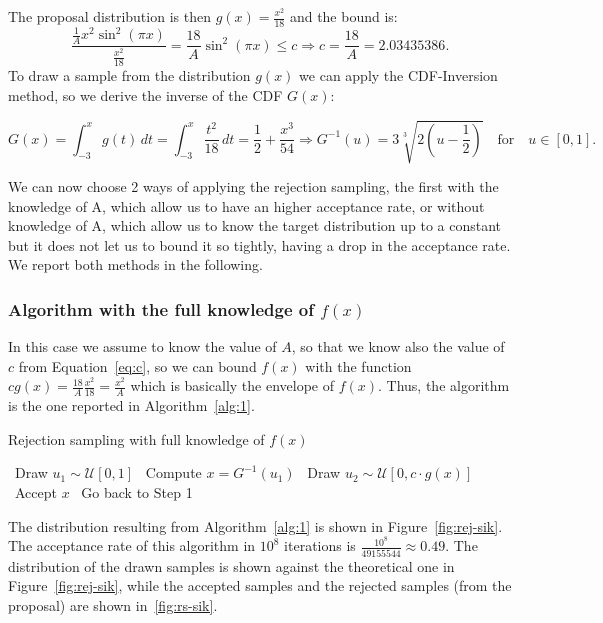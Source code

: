 \documentclass[a4paper]{article}
\begin{document}
\noindent
The proposal distribution is then $g(x) = \frac{x^2}{18}$ and the bound is:
\begin{equation}
  \label{eq:c}
  \frac{\frac{1}{A}x^2\sin^2(\pi x)}{\frac{x^2}{18}} =
  \frac{18}{A}\sin^2(\pi x) \leq c \Rightarrow c = \frac{18}{A} = 2.03435386.
\end{equation}
To draw a sample from the distribution $g(x)$ we can apply the
CDF-Inversion method, so we derive the inverse of the CDF $G(x)$:

\begin{equation*}
  G(x) = \int_{-3}^{x}g(t)\,dt = \int_{-3}^{x} \frac{t^2}{18}\,dt =
  \frac{1}{2}+\frac{x^3}{54}
  \Rightarrow G^{-1}(u) = 3\sqrt[3]{2(u-\frac{1}{2})} \quad
  \text{for}\quad u \in [0,1].
\end{equation*}

We can now choose 2 ways of applying the rejection sampling, the
first with the knowledge of A, which allow us to have an higher
acceptance rate, or without knowledge of A, which allow us to know
the target distribution up to a constant but it does not let us to
bound it so tightly, having a drop in the acceptance rate. We report
both methods in the following.

\subsubsection*{Algorithm with the full knowledge of $f(x)$}
In this case we assume to know the value of $A$, so that we know also
the value of $c$ from Equation~\ref{eq:c}, so we can bound $f(x)$ with the
function $cg(x) = \frac{18}{A}\frac{x^2}{18} =\frac{x^2}{A}$ which is
basically the envelope of $f(x)$.
Thus, the algorithm is the one reported in Algorithm~\ref{alg:1}.

\begin{algorithm}
  \caption{Rejection sampling with full knowledge of $f(x)$}\label{alg:1}
  \begin{algorithmic}[1]
    \STATE~Draw $u_1 \sim \mathcal{U}[0,1]$
    \STATE~Compute $x = G^{-1}(u_1)$
    \STATE~Draw $u_2 \sim \mathcal{U}[0, c \cdot g(x)]$
    \STATE~Accept $x$
    \ELSE%
    \STATE~Go back to Step 1
    \ENDIF%
  \end{algorithmic}
\end{algorithm}

The distribution resulting from Algorithm~\ref{alg:1} is shown in
Figure~\ref{fig:rej-sik}. The acceptance rate of this algorithm in
$10^8$ iterations is $\frac{10^8}{49155544} \approx 0.49$. The
distribution of the drawn samples is shown against the theoretical
one in Figure~\ref{fig:rej-sik}, while the accepted samples and the
rejected samples (from the proposal) are shown in~\ref{fig:rs-sik}.
\end{document}
